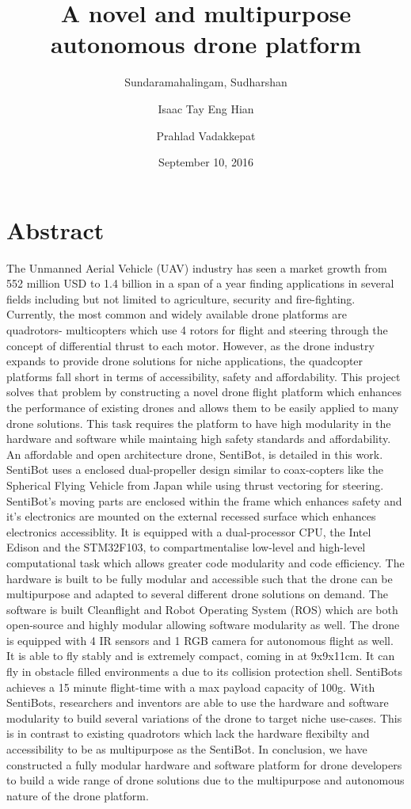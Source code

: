 \documentclass[12pt]{article}
\title{A novel and multipurpose autonomous drone platform}
\date{September 10, 2016}
\author{
	Sundaramahalingam, Sudharshan\\
	\and
	Isaac Tay Eng Hian\\
	\and
	Prahlad Vadakkepat
}
\begin{document}
\maketitle
{}
\newpage
{}

\section{Abstract}
The Unmanned Aerial Vehicle (UAV) industry has seen a market growth from 552 million USD to 1.4 billion in a span of a year finding applications in several fields including but not limited to agriculture, security and fire-fighting. Currently, the most common and widely available drone platforms are quadrotors- multicopters which use 4 rotors for flight and steering through the concept of differential thrust to each motor. However, as the drone industry expands to provide drone solutions for niche applications, the quadcopter platforms fall short in terms of accessibility, safety and affordability. This project solves that problem by constructing a novel drone flight platform which enhances the performance of existing drones and allows them to be easily applied to many drone solutions. This task requires the platform to have high modularity in the hardware and software while maintaing high safety standards and affordability. An affordable and open architecture drone, SentiBot, is detailed in this work. SentiBot uses a enclosed dual-propeller design similar to coax-copters like the Spherical Flying Vehicle from Japan while using thrust vectoring for steering. SentiBot's moving parts are enclosed within the frame which enhances safety and it's electronics are mounted on the external recessed surface which enhances electronics accessiblity. It is equipped with a dual-processor CPU, the Intel Edison and the STM32F103, to compartmentalise low-level and high-level computational task which allows greater code modularity and code efficiency. The hardware is built to be fully modular and accessible such that the drone can be multipurpose and adapted to several different drone solutions on demand. The software is built Cleanflight and Robot Operating System (ROS) which are both open-source and highly modular allowing software modularity as well. The drone is equipped with 4 IR sensors and 1 RGB camera for autonomous flight as well. It is able to fly stably and is extremely compact, coming in at 9x9x11cm. It can fly in obstacle filled environments a due to its collision protection shell. SentiBots achieves a 15 minute flight-time with a max payload capacity of 100g. With SentiBots, researchers and inventors are able to use the hardware and software modularity to build several variations of the drone to target niche use-cases. This is in contrast to existing quadrotors which lack the hardware flexibilty and accessibility to be as multipurpose as the SentiBot. In conclusion, we have constructed a fully modular hardware and software platform for drone developers to build a wide range of drone solutions due to the multipurpose and autonomous nature of the drone platform.
\end{document}
